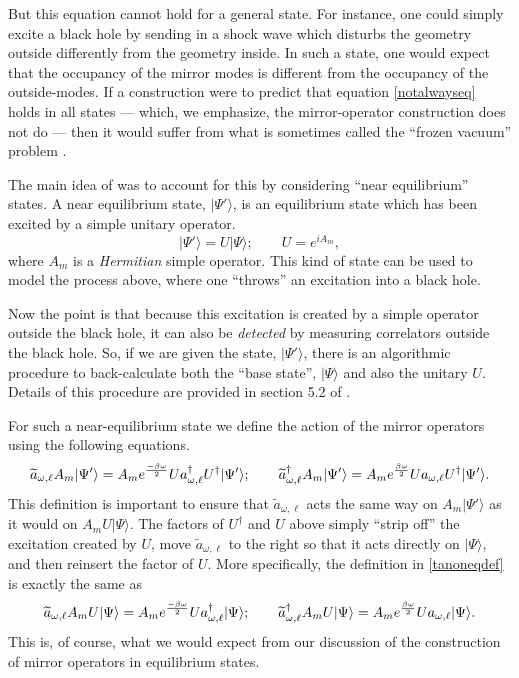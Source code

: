 \documentclass[12pt]{article}
\newcommand{\cop}[1]{#1}
\newcommand{\al}{\cop{A}} %
\def\ta{\widetilde{\cop{a}}}
\newcommand{\be}{\begin{equation}}
\newcommand{\ee}{\end{equation}}
\begin{document}
But this equation cannot hold for a general state. For instance, one could simply excite a black hole by sending in a shock wave which disturbs the geometry outside differently from the geometry inside. In such a state, one would expect that the occupancy of the mirror modes is different from the occupancy of the outside-modes. If a construction were to predict that equation \eqref{notalwayseq} holds in all states --- which, we emphasize, the mirror-operator construction does not do --- then it would suffer from what is sometimes called the ``frozen vacuum'' problem \cite{Bousso:2013ifa}.

The main idea of \cite{Papadodimas:2013jku} was to account for this by considering ``near equilibrium'' states. A near equilibrium state, $|\Psi' \rangle$,  is an equilibrium state which has been excited by a simple unitary operator.
\be
|\Psi' \rangle = U |\Psi \rangle; \qquad U = e^{i \al_m},
\ee
where $\al_m$ is a {\em Hermitian} simple operator.   This kind of state can be used to model the process above, where one ``throws'' an excitation into a black hole.

Now the point is that because this excitation is created by a simple operator outside the black hole, it can also be {\em detected} by measuring correlators outside the black hole. So, if we are given the state, $|\Psi' \rangle$, there is an algorithmic procedure to back-calculate both the ``base state'', $|\Psi \rangle$ and also the unitary $U$. Details of this procedure are provided in section 5.2 of \cite{Papadodimas:2013jku}. 

For such a near-equilibrium state we  define the action of the mirror operators using the following equations.
\be
\label{tanoneqdef}
\ta_{\omega, \ell} \al_m |\Psi' \rangle = \al_m  e^{-\beta \omega \over 2} U  a_{\omega, \ell}^{\dagger}  U^{\dagger} |\Psi' \rangle; \qquad \ta_{\omega, \ell}^{\dagger} \al_m |\Psi' \rangle = \al_m  e^{\beta \omega \over 2} U  a_{\omega, \ell}  U^{\dagger} |\Psi' \rangle.
\ee
This definition is important to ensure that $\ta_{\omega, \ell}$ acts the same way on $\al_m |\Psi' \rangle$ as it would on $\al_m U |\Psi \rangle$. The factors of $U^{\dagger}$ and $U$ above simply  ``strip off'' the excitation created by $U$, move $\ta_{\omega, \ell}$ to the right so that it acts directly on $|\Psi \rangle$, and then reinsert the factor of $U$. More specifically, the definition in \eqref{tanoneqdef} is exactly the same as
\be
\ta_{\omega, \ell} \al_m U |\Psi \rangle = \al_m  e^{-\beta \omega \over 2} U  a_{\omega, \ell}^{\dagger}  |\Psi \rangle; \qquad \ta_{\omega, \ell}^{\dagger} \al_m U |\Psi \rangle = \al_m  e^{\beta \omega \over 2} U  a_{\omega, \ell} |\Psi\rangle.
\ee
This is, of course, what we would expect from our discussion of the construction of mirror operators in equilibrium states. 
\end{document}
